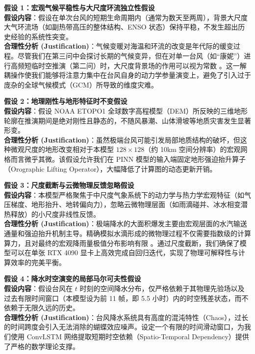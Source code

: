 \documentclass[12pt,a4paper]{ctexart}
\begin{document}
\textbf{假设 1：宏观气候平稳性与大尺度环流独立性假设} \\
\textbf{假设内容}：假设在单次台风的短期生命周期内（通常为数天至两周），背景大尺度大气环流场（如副热带高压的整体结构、ENSO 状态）保持平稳，不发生超出历史经验的系统性突变。\\
\textbf{合理性分析 (Justification)}：气候变暖对海温和环流的改变是年代际的缓变过程。尽管我们在第三问中会探讨长期的气候变异，但在对单一台风（如“康妮”）进行高频短临时空推演（第二问）时，大尺度背景场的作用可以视为常数 \cite[第112页]{shoushaowen}。这一解耦操作使我们能够将注意力集中在台风自身的动力学参量演变上，避免了引入过于庞杂的全球气候模式（GCM）所导致的维度灾难。

\textbf{假设 2：地理刚性与地形特征时不变假设} \\
\textbf{假设内容}：假设 NOAA ETOPO1 全球数字高程模型（DEM）所反映的三维地形轮廓在推演期间是绝对刚性且静态的，不随风暴潮、山体滑坡等地质灾害发生显著形变。\\
\textbf{合理性分析 (Justification)}：虽然极端台风可能引发局部地质结构的破坏，但这种微观尺度的地形改变相对于本模型 $128 \times 128$（约 10km 空间分辨率）的宏观网格而言微乎其微。该假设允许我们在 PINN 模型的输入端固定地形强迫抬升算子（Orographic Lifting Operator），大幅降低了计算图的动态更新开销。

\textbf{假设 3：尺度截断与云微物理反馈忽略假设} \\
\textbf{假设内容}：本模型严格聚焦于中尺度气象系统下的动力学与热力学宏观特征（如气压梯度、地形抬升、地转偏向力），忽略云微物理层面（如雨滴碰并、冰水相变潜热释放）的小尺度非线性反馈。\\
\textbf{合理性分析 (Justification)}：极端降水的大面积爆发主要由宏观层面的水汽输送通量和强迫抬升机制主导。精确模拟水滴形成的微物理过程不仅需要指数级的计算算力，且对最终的宏观降雨量极值分布影响有限 \cite[第145页]{shoushaowen}。通过尺度截断，我们确保了模型可以在单张 RTX 4090 显卡上高效完成自回归迭代，实现了物理可解释性与计算效率的完美平衡。

\textbf{假设 4：降水时空演变的局部马尔可夫性假设} \\
\textbf{假设内容}：假设台风在 $t$ 时刻的空间降水分布，仅严格依赖于其物理先验场以及过去有限时间窗口（本模型设为前 11 帧，即 5.5 小时）内的时空残差状态，而不依赖于无限久远的历史。\\
\textbf{合理性分析 (Justification)}：台风降水系统具有高度的混沌特性（Chaos），过长的时间跨度会引入无法消除的蝴蝶效应噪声。设定一个有限的时间滑动窗口，为我们使用 ConvLSTM 网络提取短期时空依赖（Spatio-Temporal Dependency）提供了严格的数学理论支撑。
\end{document}
